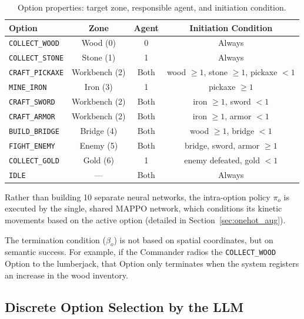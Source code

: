 \begin{table}[H]
\centering
\caption{Option properties: target zone, responsible agent, and initiation condition.}
\label{tab:option_props}
\small
\begin{tabular}{@{}lccc@{}}
\toprule
\textbf{Option} & \textbf{Zone} & \textbf{Agent} & \textbf{Initiation Condition} \\
\midrule
\texttt{COLLECT\_WOOD}  & Wood (0)      & 0     & Always \\
\texttt{COLLECT\_STONE} & Stone (1)     & 1     & Always \\
\texttt{CRAFT\_PICKAXE} & Workbench (2) & Both  & wood $\ge 1$, stone $\ge 1$, pickaxe $< 1$ \\
\texttt{MINE\_IRON}     & Iron (3)      & 1     & pickaxe $\ge 1$ \\
\texttt{CRAFT\_SWORD}   & Workbench (2) & Both  & iron $\ge 1$, sword $< 1$ \\
\texttt{CRAFT\_ARMOR}   & Workbench (2) & Both  & iron $\ge 1$, armor $< 1$ \\
\texttt{BUILD\_BRIDGE}  & Bridge (4)    & Both  & wood $\ge 1$, bridge $< 1$ \\
\texttt{FIGHT\_ENEMY}   & Enemy (5)     & Both  & bridge, sword, armor $\ge 1$ \\
\texttt{COLLECT\_GOLD}  & Gold (6)      & 1     & enemy defeated, gold $< 1$ \\
\texttt{IDLE}           & ---           & Both  & Always \\
\bottomrule
\end{tabular}
\end{table}

Rather than building 10 separate neural networks, the intra-option policy $\pi_o$ is executed by the single, shared MAPPO network, which conditions its kinetic movements based on the active option (detailed in Section~\ref{sec:onehot_aug}).

The termination condition ($\beta_o$) is not based on spatial coordinates, but on semantic success. For example, if the Commander radios the \texttt{COLLECT\_WOOD} Option to the lumberjack, that Option only terminates when the system registers an increase in the wood inventory.

\subsection{Discrete Option Selection by the LLM}
\label{sec:discrete_selection}

